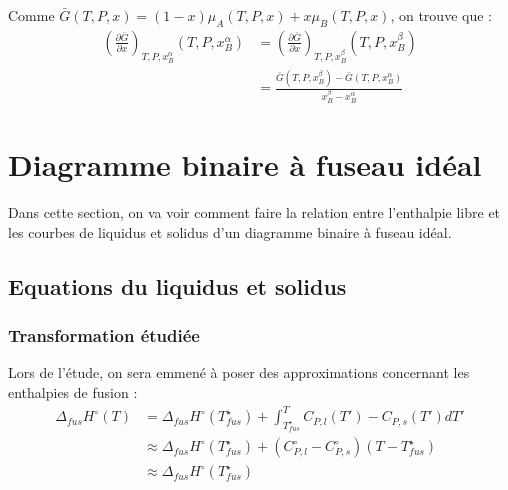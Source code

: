 \documentclass[a4paper]{book}
\begin{document}
Comme $\bar{G} (T, P, x) = (1-x) \mu_A (T, P, x) + x \mu_B (T, P, x)$, on trouve que :
\begin{align*}\left( \frac{\partial \bar{G}}{\partial x} \right)_{T, P, x_B^\alpha} (T, P, x_B^\alpha) &= \left( \frac{\partial \bar{G}}{\partial x} \right)_{T, P, x_B^\beta} (T, P, x_B^\beta) \\
&= \frac{\bar{G} (T, P, x_B^\beta) - \bar{G} (T, P, x_B^\alpha)}{x_B^\beta - x_B^\alpha}
\end{align*}


\section{Diagramme binaire à fuseau idéal}

Dans cette section, on va voir comment faire la relation entre l'enthalpie libre et les courbes de liquidus et solidus d'un diagramme binaire à fuseau idéal.

\subsection{Equations du liquidus et solidus}

\subsubsection{Transformation étudiée}

Lors de l'étude, on sera emmené à poser des approximations concernant les enthalpies de fusion : 
\begin{align*}
\Delta_{fus} H^\circ (T) &= \Delta_{fus} H^\circ (T_{fus}^\star) + \int_{T_{fus}^\star}^T C_{P,l} (T') - C_{P, s} (T') dT' \\
&\approx \Delta_{fus} H^\circ (T_{fus}^\star) + (C^\circ_{P,l} - C_{P, s}^\circ )(T - T_{fus}^\star) \\
&\approx \Delta_{fus} H^\circ (T_{fus}^\star)
\end{align*}
\end{document}
